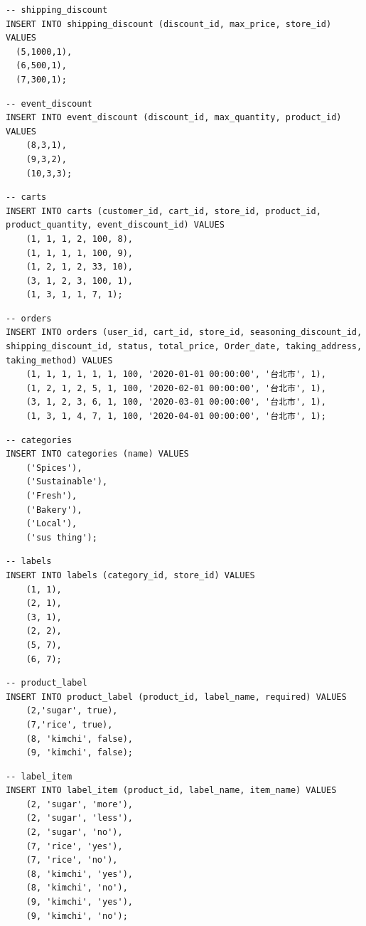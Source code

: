 \documentclass[a4paper, 12pt]{article}
\begin{document}
\begin{lstlisting}
-- shipping_discount
INSERT INTO shipping_discount (discount_id, max_price, store_id) VALUES
  (5,1000,1),
  (6,500,1),
  (7,300,1);
\end{lstlisting}

\begin{lstlisting}
-- event_discount
INSERT INTO event_discount (discount_id, max_quantity, product_id) VALUES
    (8,3,1),
    (9,3,2),
    (10,3,3);
\end{lstlisting}

\begin{lstlisting}
-- carts
INSERT INTO carts (customer_id, cart_id, store_id, product_id, product_quantity, event_discount_id) VALUES
    (1, 1, 1, 2, 100, 8),
    (1, 1, 1, 1, 100, 9),
    (1, 2, 1, 2, 33, 10),
    (3, 1, 2, 3, 100, 1),
    (1, 3, 1, 1, 7, 1);
\end{lstlisting}

\begin{lstlisting}
-- orders
INSERT INTO orders (user_id, cart_id, store_id, seasoning_discount_id, shipping_discount_id, status, total_price, Order_date, taking_address, taking_method) VALUES 
    (1, 1, 1, 1, 1, 1, 100, '2020-01-01 00:00:00', '台北市', 1),
    (1, 2, 1, 2, 5, 1, 100, '2020-02-01 00:00:00', '台北市', 1),
    (3, 1, 2, 3, 6, 1, 100, '2020-03-01 00:00:00', '台北市', 1),
    (1, 3, 1, 4, 7, 1, 100, '2020-04-01 00:00:00', '台北市', 1);
\end{lstlisting}

\begin{lstlisting}
-- categories
INSERT INTO categories (name) VALUES
    ('Spices'),
    ('Sustainable'),
    ('Fresh'),
    ('Bakery'),
    ('Local'),
    ('sus thing');
\end{lstlisting}

\begin{lstlisting}
-- labels
INSERT INTO labels (category_id, store_id) VALUES
    (1, 1),
    (2, 1),
    (3, 1),
    (2, 2),
    (5, 7),
    (6, 7);
\end{lstlisting}

\begin{lstlisting}
-- product_label
INSERT INTO product_label (product_id, label_name, required) VALUES
    (2,'sugar', true),
    (7,'rice', true),
    (8, 'kimchi', false),
    (9, 'kimchi', false);
\end{lstlisting}

\begin{lstlisting}
-- label_item
INSERT INTO label_item (product_id, label_name, item_name) VALUES
    (2, 'sugar', 'more'),
    (2, 'sugar', 'less'),
    (2, 'sugar', 'no'),
    (7, 'rice', 'yes'),
    (7, 'rice', 'no'),
    (8, 'kimchi', 'yes'),
    (8, 'kimchi', 'no'),
    (9, 'kimchi', 'yes'),
    (9, 'kimchi', 'no');
\end{lstlisting}
\end{document}
